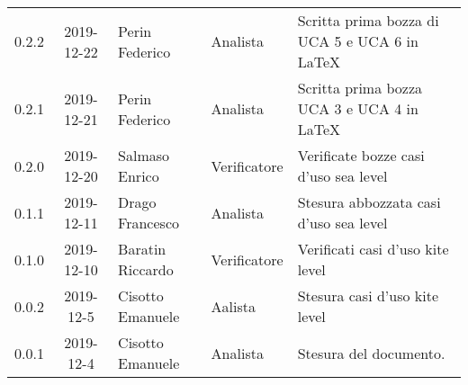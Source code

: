 {\begin{longtable}{ c c  C{4cm}  C{3cm} C{4cm}}
0.2.2 & 2019-12-22 & Perin Federico & Analista & Scritta prima bozza di UCA 5 e UCA 6 in LaTeX\\

0.2.1 & 2019-12-21 & Perin Federico & Analista & Scritta prima bozza UCA 3 e UCA 4 in LaTeX\\

0.2.0 & 2019-12-20 & Salmaso Enrico & Verificatore & Verificate bozze casi d'uso sea level\\

0.1.1 & 2019-12-11 & Drago Francesco & Analista & Stesura abbozzata casi d'uso sea level\\

0.1.0 & 2019-12-10 & Baratin Riccardo & Verificatore & Verificati casi d'uso kite level\\

0.0.2 & 2019-12-5 & Cisotto Emanuele & Aalista & Stesura casi d'uso kite level\\

0.0.1 & 2019-12-4 & Cisotto Emanuele & Analista & Stesura del documento.  \\		
		
\end{longtable}
}